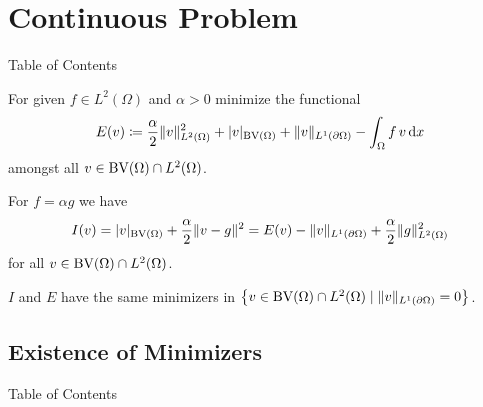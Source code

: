 \documentclass[xcolor=svgnames,english]{beamer}
\begin{document}

\section{Continuous Problem}
\begin{frame}{Table of Contents}
\end{frame}

\begin{frame}
  For given $f\in L^2(\Omega)$ and $\alpha>0$ minimize the functional 
  \begin{align*}\label{eq:continuousProblem}
    E(v)\coloneqq \frac{\alpha}{2}\Vert v\Vert_{L^2(\Omega)}^2 + |v|_{\textup{BV}(\Omega)}
    +\Vert v\Vert_{L^1(\partial\Omega)}-\int_\Omega f\,v\,\mathrm{d}x
  \end{align*}
  amongst all $v\in \textup{BV}(\Omega)\cap L^2(\Omega)$.

  \pause
  \bigskip
  

  For $f = \alpha g$ we have
  \begin{align*}
    I(v) 
    = |v|_{\textup{BV}(\Omega)}+\frac{\alpha}{2}\Vert v-g\Vert^2
    = E(v) - \Vert v\Vert_{L^1(\partial \Omega)}+ \frac{\alpha}{2}\Vert
    g\Vert_{L^2(\Omega)}^2
  \end{align*}
  for all $v\in \textup{BV}(\Omega)\cap L^2(\Omega)$.
  
  \pause
  \medskip

  $I$ and $E$ have the same minimizers in $\left\{v\in\textup{BV}(\Omega)\cap
  L^2(\Omega)\mid \Vert v\Vert_{L^1(\partial\Omega)}=0\right\}$.
\end{frame}

\subsection{Existence of Minimizers}
\begin{frame}{Table of Contents}
\end{frame}
\end{document}
